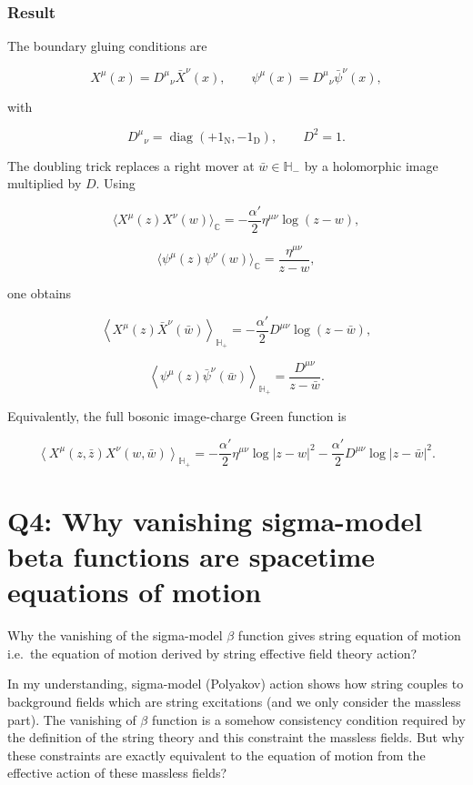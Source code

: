 \documentclass[
  10pt,
  a4paper,
  openany]{book}
\begin{document}
\subsubsection{Result}\label{result-32}

The boundary gluing conditions are

\[
X^\mu(x)=D^\mu{}_\nu\bar X^\nu(x),
\qquad
\psi^\mu(x)=D^\mu{}_\nu\bar\psi^\nu(x),
\]

with

\[
D^\mu{}_\nu
=\operatorname{diag}(+1_{\mathrm N},-1_{\mathrm D}),
\qquad
D^2=1.
\]

The doubling trick replaces a right mover at \(\bar w\in\mathbb H_-\) by
a holomorphic image multiplied by \(D\). Using

\[
\langle X^\mu(z)X^\nu(w)\rangle_{\mathbb C}
=-\frac{\alpha'}2\eta^{\mu\nu}\log(z-w),
\]

\[
\langle\psi^\mu(z)\psi^\nu(w)\rangle_{\mathbb C}
=\frac{\eta^{\mu\nu}}{z-w},
\]

one obtains

\[
\boxed{
\left\langle X^\mu(z)\bar X^\nu(\bar w)\right\rangle_{\mathbb H_+}
=-\frac{\alpha'}2D^{\mu\nu}\log(z-\bar w),
}
\]

\[
\boxed{
\left\langle\psi^\mu(z)\bar\psi^\nu(\bar w)\right\rangle_{\mathbb H_+}
=\frac{D^{\mu\nu}}{z-\bar w}.
}
\]

Equivalently, the full bosonic image-charge Green function is

\[
\boxed{
\left\langle X^\mu(z,\bar z)X^\nu(w,\bar w)\right\rangle_{\mathbb H_+}
=-\frac{\alpha'}2\eta^{\mu\nu}\log|z-w|^2
-\frac{\alpha'}2D^{\mu\nu}\log|z-\bar w|^2.
}
\]

\section{Q4: Why vanishing sigma-model beta functions are spacetime
equations of
motion}\label{q4-why-vanishing-sigma-model-beta-functions-are-spacetime-equations-of-motion}

Why the vanishing of the sigma-model \(\beta\) function gives string
equation of motion i.e.~the equation of motion derived by string
effective field theory action?

In my understanding, sigma-model (Polyakov) action shows how string
couples to background fields which are string excitations (and we only
consider the massless part). The vanishing of \(\beta\) function is a
somehow consistency condition required by the definition of the string
theory and this constraint the massless fields. But why these
constraints are exactly equivalent to the equation of motion from the
effective action of these massless fields?
\end{document}
